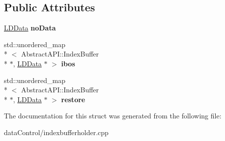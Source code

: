 \subsection*{Public Attributes}
\begin{DoxyCompactItemize}
\item 
\hypertarget{struct_index_buffer_holder_1_1_data_acce28854207b44d5e4cb167bc5c7799b}{\hyperlink{struct_index_buffer_holder_1_1_data_1_1_l_d_data}{L\+D\+Data} {\bfseries no\+Data}}\label{struct_index_buffer_holder_1_1_data_acce28854207b44d5e4cb167bc5c7799b}

\item 
\hypertarget{struct_index_buffer_holder_1_1_data_a524f7eb8e3b979f91bfe652ebe19d0f0}{std\+::unordered\+\_\+map\\*
$<$ Abstract\+A\+P\+I\+::\+Index\+Buffer \\*
$\ast$, \hyperlink{struct_index_buffer_holder_1_1_data_1_1_l_d_data}{L\+D\+Data} $\ast$ $>$ {\bfseries ibos}}\label{struct_index_buffer_holder_1_1_data_a524f7eb8e3b979f91bfe652ebe19d0f0}

\item 
\hypertarget{struct_index_buffer_holder_1_1_data_a86c3dc33552feb31ba80c3d064fd1d6a}{std\+::unordered\+\_\+map\\*
$<$ Abstract\+A\+P\+I\+::\+Index\+Buffer \\*
$\ast$, \hyperlink{struct_index_buffer_holder_1_1_data_1_1_l_d_data}{L\+D\+Data} $\ast$ $>$ {\bfseries restore}}\label{struct_index_buffer_holder_1_1_data_a86c3dc33552feb31ba80c3d064fd1d6a}

\end{DoxyCompactItemize}


The documentation for this struct was generated from the following file\+:\begin{DoxyCompactItemize}
\item 
data\+Control/indexbufferholder.\+cpp\end{DoxyCompactItemize}
